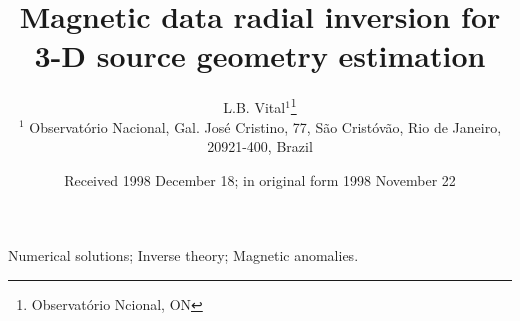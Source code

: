 \documentclass[extra,mreferee]{gji}
\title[Geophys.\ J.\ Int.: Magnetic radial inversion]
  {Magnetic data radial inversion for 3-D source geometry estimation}
\author[L.B. Vital, V.C. Oliveira Jr., V.C.F. Barbosa]
  {L.B. Vital$^1$\thanks{Observatório Ncional, ON}\\
  $^1$ Observat{\'o}rio Nacional, Gal. Jos{\'e} Cristino, 77, São Crist{\'o}v{\~a}o,
  Rio de Janeiro, 20921-400, Brazil
  }
\date{Received 1998 December 18; in original form 1998 November 22}
\begin{document}
\label{firstpage}

\maketitle

%

\begin{keywords}
 Numerical solutions; Inverse theory; Magnetic anomalies.
\end{keywords}

%





%

%

\begin{acknowledgments}
\end{acknowledgments}






\appendix

\label{lastpage}
\end{document}
